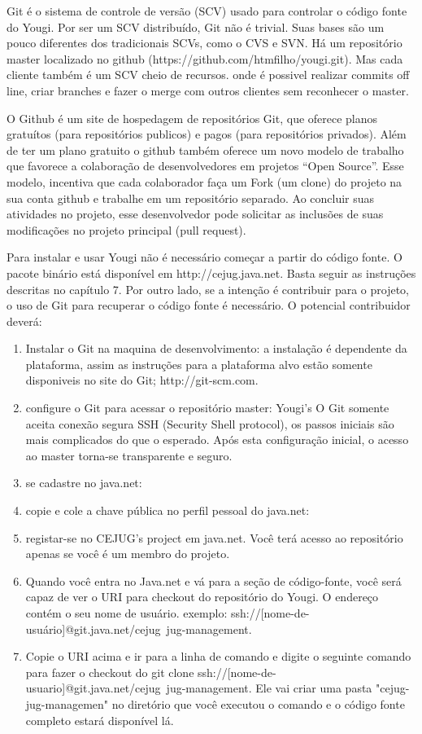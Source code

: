 \documentclass[envcountsame,envcountchap,letterpaper]{svmono}
\begin{document}
Git é o sistema de controle de versão (SCV) usado para controlar o código fonte do Yougi. Por ser um SCV distribuído, Git não é trivial. Suas bases são um pouco diferentes dos tradicionais SCVs, como o CVS e SVN. Há um repositório master localizado no github (https://github.com/htmfilho/yougi.git). Mas cada cliente também é um SCV cheio de recursos. onde é possivel realizar commits off line, criar branches e fazer o merge com outros clientes sem reconhecer o master.

O Github é um site de hospedagem de repositórios Git, que oferece planos gratuítos (para repositórios publicos) e pagos (para repositórios privados). Além de ter um plano gratuito o github também oferece um novo modelo de trabalho que favorece a colaboração de desenvolvedores em projetos “Open Source”. Esse modelo, incentiva que cada colaborador faça um Fork (um clone) do projeto na sua conta github e trabalhe em um repositório separado. Ao concluir suas atividades no projeto, esse desenvolvedor pode solicitar as inclusões de suas modificações no projeto principal (pull request).

Para instalar e usar Yougi não é necessário começar a partir do código fonte. O pacote binário está disponível em http://cejug.java.net. Basta seguir as instruções descritas no capítulo 7. Por outro lado, se a intenção é contribuir para o projeto, o uso de Git para recuperar o código fonte é necessário. O potencial contribuidor deverá:

\begin{enumerate}
\item Instalar o Git na maquina de desenvolvimento: a instalação é dependente da plataforma, assim as instruções para a plataforma alvo estão somente disponiveis no site do Git; http://git-scm.com.
\item configure o Git para acessar o repositório master: Yougi's O Git somente aceita conexão segura SSH (Security Shell protocol), os passos iniciais são mais complicados do que o esperado. Após esta configuração inicial, o acesso ao master torna-se transparente e seguro.
\item se cadastre no java.net:
\item copie e cole a chave pública no perfil pessoal do java.net:
\item registar-se no CEJUG's project em java.net. Você terá acesso ao repositório apenas se você é um membro do projeto.
\item Quando você entra no Java.net e vá para a seção de código-fonte, você será capaz de ver o URI para checkout do repositório do Yougi. O endereço contém o seu nome de usuário. exemplo: ssh://[nome-de-usuário]@git.java.net/cejug~jug-management.
\item Copie o URI acima e ir para a linha de comando e digite o seguinte comando para fazer o checkout do git clone ssh://[nome-de-usuario]@git.java.net/cejug~jug-management. Ele vai criar uma pasta "cejug-jug-managemen" no diretório que você executou o comando e o código fonte completo estará disponível lá.
\end{enumerate}
\end{document}
